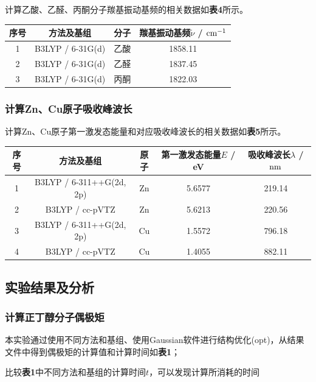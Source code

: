 \documentclass[12pt]{article}
\begin{document}
 		计算乙酸、乙醛、丙酮分子羰基振动基频的相关数据如\textbf{表4}所示。
 		  \begin{table}[h]
 			\centering
 			\begin{tabular}{cccc}
 				\toprule
 				序号 & 方法及基组 & 分子 & 羰基振动基频$\tilde{\nu}$ / ${\rm cm^{-1}}$ \\
 			\midrule
 			1 & B3LYP / 6-31G(d) & 乙酸 & 1858.11 \\
 			2 & B3LYP / 6-31G(d) & 乙醛 & 1837.45 \\
 			3 & B3LYP / 6-31G(d) & 丙酮 & 1822.03 \\
 			
 				\bottomrule
 			\end{tabular}
 		\end{table}
 	
 		 \subsubsection{计算Zn、Cu原子吸收峰波长}
 		计算Zn、Cu原子第一激发态能量和对应吸收峰波长的相关数据如\textbf{表5}所示。
 		  \begin{table}[h]
 		  	\setlength{\belowcaptionskip}{-0.73pt}
 			\centering
 			\begin{tabular}{ccccc}
 				\toprule
 				序号 & 方法及基组 & 原子 & 第一激发态能量$E$ / eV & 吸收峰波长$\lambda$ / ${\rm nm}$ \\
 			\midrule
 			1 & B3LYP / 6-311++G(2d, 2p) & Zn & 5.6577 & 219.14 \\
 			2 & B3LYP / cc-pVTZ & Zn & 5.6213 & 220.56 \\
 			3 & B3LYP / 6-311++G(2d, 2p) & Cu & 1.5572 & 796.18 \\
 			4 & B3LYP / cc-pVTZ & Cu & 1.4055 & 882.11 \\
 				\bottomrule
 			\end{tabular}
 		\end{table}
 	
 		\subsection{实验结果及分析}

 		\subsubsection{计算正丁醇分子偶极矩}
 		本实验通过使用不同方法和基组、使用Gaussian软件进行结构优化(opt)，从结果文件中得到偶极矩的计算值和计算时间如\textbf{表1}；\par 比较\textbf{表1}中不同方法和基组的计算时间$t$，可以发现计算所消耗的时间
 
\end{document}

